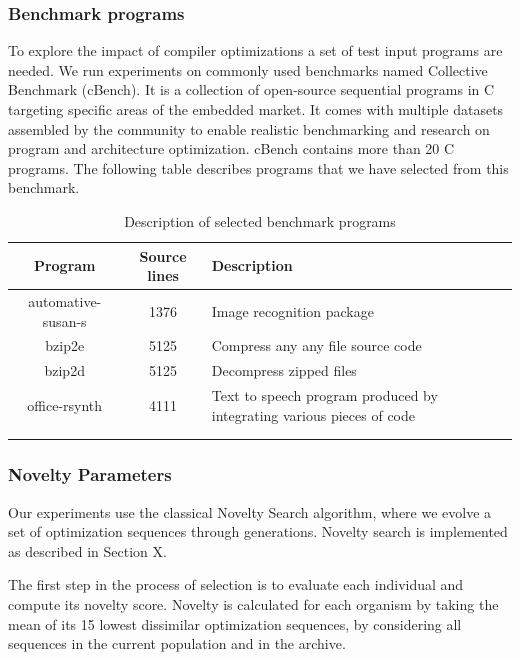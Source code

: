 \subsubsection{Benchmark programs}
To explore the impact of compiler optimizations a set of test input programs are needed. We run experiments on commonly used benchmarks named Collective Benchmark (cBench). It is a collection of open-source sequential programs in C targeting specific areas of the embedded market. It comes with multiple datasets assembled by the community to enable realistic benchmarking and research on program and architecture optimization. cBench contains more than 20 C programs. The following table describes programs that we have selected from this benchmark.
\begin{table}[h]
	\begin{center}
		\begin{tabular}{|c|c|p{4cm}|}
			\hline
			\textbf{Program} & \textbf{Source lines} & \textbf{Description}\\
			\hline
			automative-susan-s & 1376 & Image recognition package\\
			\hline
			bzip2e & 5125 & Compress any any file
			source code \\
			\hline
			bzip2d & 5125 & Decompress zipped files \\
			\hline
			office-rsynth & 4111 & Text to speech program produced by integrating various pieces of code\\
			\hline
			 &  & \\
			
			\hline
			 & & \\
			\hline
			
		\end{tabular}
		
	\end{center}
	\caption {Description of selected benchmark programs}
\end{table}
\subsubsection{Novelty Parameters}
Our experiments use the classical Novelty Search algorithm, where we evolve a set of optimization sequences through generations.
Novelty search is implemented as described in Section X.

The first step in the process of selection is to evaluate each individual and compute its novelty score. Novelty is calculated for each organism by taking the mean of its 15 lowest dissimilar optimization sequences, by considering all sequences in the current population and in the archive. 

